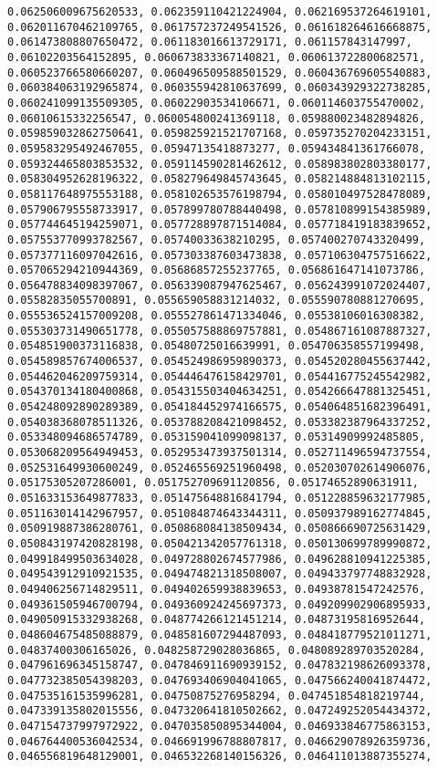 \documentclass[11pt]{article}
\begin{document}
\begin{Verbatim}[commandchars=\\\{\}]
0.062506009675620533, 0.062359110421224904, 0.062169537264619101, 0.062011670462109765, 0.061757237249541526, 0.061618264616668875, 0.061473808807650472, 0.061183016613729171, 0.061157843147997, 0.06102203564152895, 0.060673833367140821, 0.060613722800682571, 0.060523766580660207, 0.060496509588501529, 0.060436769605540883, 0.060384063192965874, 0.060355942810637699, 0.060343929322738285, 0.060241099135509305, 0.06022903534106671, 0.060114603755470002, 0.06010615332256547, 0.060054800241369118, 0.059880023482894826, 0.059859032862750641, 0.059825921521707168, 0.059735270204233151, 0.059583295492467055, 0.05947135418873277, 0.059434841361766078, 0.059324465803853532, 0.059114590281462612, 0.058983802803380177, 0.058304952628196322, 0.058279649845743645, 0.058214884813102115, 0.058117648975553188, 0.058102653576198794, 0.058010497528478089, 0.057906795558733917, 0.057899780788440498, 0.057810899154385989, 0.057744645194259071, 0.057728897871514084, 0.057718419183839652, 0.057553770993782567, 0.05740033638210295, 0.057400270743320499, 0.057377116097042616, 0.057303387603473838, 0.057106304757516622, 0.057065294210944369, 0.05686857255237765, 0.056861647141073786, 0.056478834098397067, 0.056339087947625467, 0.056243991072024407, 0.05582835055700891, 0.055659058831214032, 0.055590780881270695, 0.055536524157009208, 0.055527861471334046, 0.05538106016308382, 0.055303731490651778, 0.055057588869757881, 0.054867161087887327, 0.054851900373116838, 0.05480725016639991, 0.054706358557199498, 0.054589857674006537, 0.054524986959890373, 0.054520280455637442, 0.054462046209759314, 0.054446476158429701, 0.054416775245542982, 0.054370134180400868, 0.054315503404634251, 0.054266647881325451, 0.054248092890289389, 0.054184452974166575, 0.054064851682396491, 0.054038368078511326, 0.053788208421098452, 0.053382387964337252, 0.053348094686574789, 0.053159041099098137, 0.05314909992485805, 0.053068209564949453, 0.052953473937501314, 0.052711496594737554, 0.052531649930600249, 0.052465569251960498, 0.052030702614906076, 0.05175305207286001, 0.051752709691120856, 0.05174652890631911, 0.051633153649877833, 0.051475648816841794, 0.051228859632177985, 0.051163014142967957, 0.051084874643344311, 0.050937989162774845, 0.050919887386280761, 0.050868084138509434, 0.050866690725631429, 0.050843197420828198, 0.050421342057761318, 0.050130699789990872, 0.049918499503634028, 0.049728802674577986, 0.049628810941225385, 0.049543912910921535, 0.049474821318508007, 0.049433797748832928, 0.049406256714829511, 0.049402659938839653, 0.04938781547242576, 0.049361505946700794, 0.049360924245697373, 0.049209902906895933, 0.049050915332938268, 0.048774266121451214, 0.04873195816952644, 0.048604675485088879, 0.048581607294487093, 0.048418779521011271, 0.04837400306165026, 0.048258729028036865, 0.048089289703520284, 0.047961696345158747, 0.047846911690939152, 0.047832198626093378, 0.047732385054398203, 0.047693406904041065, 0.047566240041874472, 0.047535161535996281, 0.04750875276958294, 0.047451854818219744, 0.047339135802015556, 0.047320641810502662, 0.047249252054434372, 0.047154737997972922, 0.047035850895344004, 0.046933846775863153, 0.046764400536042534, 0.046691996788807817, 0.046629078926359736, 0.046556819648129001, 0.046532268140156326, 0.046411013887355274, 
\end{Verbatim}
\end{document}

